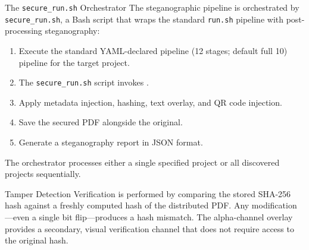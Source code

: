 \documentclass[
  ignorenonframetext,
]{beamer}
\providecommand{\tightlist}{%
  \setlength{\itemsep}{0pt}\setlength{\parskip}{0pt}}
\begin{document}
\begin{frame}{The \texttt{secure\_run.sh}
Orchestrator}
\protect{}\label{the-secure_run.sh-orchestrator}
The steganographic pipeline is orchestrated by \texttt{secure\_run.sh},
a Bash script that wraps the standard \texttt{run.sh} pipeline with
post-processing steganography:

\begin{enumerate}
\tightlist
\item
  Execute the standard YAML-declared pipeline (12 stages; default full
  10) pipeline for the target project.
\item
  The \texttt{secure\_run.sh} script invokes
  .
\item
  Apply metadata injection, hashing, text overlay, and QR code
  injection.
\item
  Save the secured PDF alongside the original.
\item
  Generate a steganography report in JSON format.
\end{enumerate}

The orchestrator processes either a single specified project or all
discovered projects sequentially.
\end{frame}

\begin{frame}[allowframebreaks]{Tamper Detection}
\protect{}\label{tamper-detection}
Verification is performed by comparing the stored SHA-256 hash against a
freshly computed hash of the distributed PDF. Any modification---even a
single bit flip---produces a hash mismatch. The alpha-channel overlay
provides a secondary, visual verification channel that does not require
access to the original hash.
\end{frame}
\end{document}

